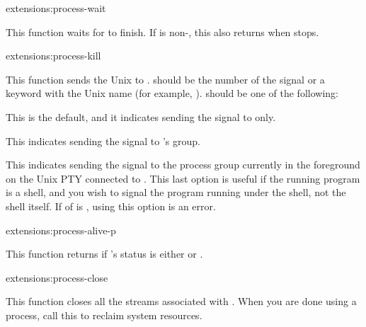 \begin{defun}{extensions:}{process-wait}{
    }
  
  This function waits for  to finish.  If
   is non-\nil, this also returns when
   stops.
\end{defun}

\begin{defun}{extensions:}{process-kill}{%
    }
  
  This function sends the Unix  to .
   should be the number of the signal or a keyword with
  the Unix name (for example, ).   should be
  one of the following:
  \begin{Lentry}
    
  \item[\kwd{pid}] This is the default, and it indicates sending the
    signal to  only.
    
  \item[\kwd{process-group}] This indicates sending the signal to
    's group.
    
  \item[\kwd{pty-process-group}] This indicates sending the signal to
    the process group currently in the foreground on the Unix PTY
    connected to .  This last option is useful if the
    running program is a shell, and you wish to signal the program
    running under the shell, not the shell itself.  If
     of  is \nil, using this option is
    an error.
  \end{Lentry}
\end{defun}

\begin{defun}{extensions:}{process-alive-p}{}
  
  This function returns \true{} if 's status is either
   or .
\end{defun}

\begin{defun}{extensions:}{process-close}{}
  
  This function closes all the streams associated with .
  When you are done using a process, call this to reclaim system
  resources.
\end{defun}



